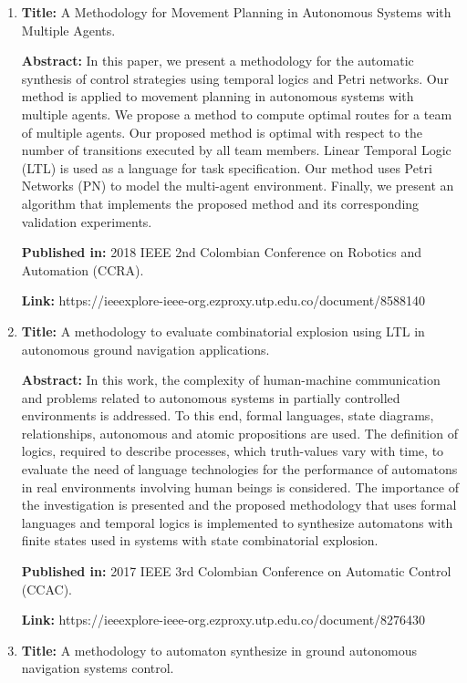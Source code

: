 \documentclass[11pt,a4paper,sans,english]{moderncv}        %
\begin{document}
\begin{enumerate}
    \item \textbf{Title:} A Methodology for Movement Planning in Autonomous Systems with Multiple Agents.
    
    \textbf{Abstract:} In this paper, we present a methodology for the automatic synthesis of control strategies using temporal logics and Petri networks. Our method is applied to movement planning in autonomous systems with multiple agents. We propose a method to compute optimal routes for a team of multiple agents. Our proposed method is optimal with respect to the number of transitions executed by all team members. Linear Temporal Logic (LTL) is used as a language for task specification. Our method uses Petri Networks (PN) to model the multi-agent environment. Finally, we present an algorithm that implements the proposed method and its corresponding validation experiments.
    
    \textbf{Published in:} 2018 IEEE 2nd Colombian Conference on Robotics and Automation (CCRA).
    
    \textbf{Link:} https://ieeexplore-ieee-org.ezproxy.utp.edu.co/document/8588140
    
    \item \textbf{Title:} A methodology to evaluate combinatorial explosion using LTL in autonomous ground navigation applications.
    
    \textbf{Abstract:} In this work, the complexity of human-machine communication and problems related to autonomous systems in partially controlled environments is addressed. To this end, formal languages, state diagrams, relationships, autonomous and atomic propositions are used. The definition of logics, required to describe processes, which truth-values vary with time, to evaluate the need of language technologies for the performance of automatons in real environments involving human beings is considered. The importance of the investigation is presented and the proposed methodology that uses formal languages and temporal logics is implemented to synthesize automatons with finite states used in systems with state combinatorial explosion.
    
    \textbf{Published in:} 2017 IEEE 3rd Colombian Conference on Automatic Control (CCAC).
    
    \textbf{Link:} https://ieeexplore-ieee-org.ezproxy.utp.edu.co/document/8276430
    
    \item \textbf{Title:} A methodology to automaton synthesize in ground autonomous navigation systems control.
    

\end{enumerate}
\end{document}
